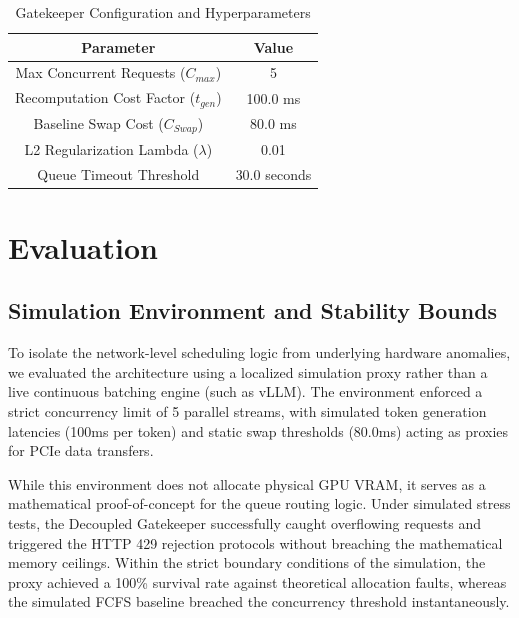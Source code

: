 \documentclass[conference]{IEEEtran}
\begin{document}
\begin{table}[h]
\caption{Gatekeeper Configuration and Hyperparameters}
\begin{center}
\begin{tabular}{|c|c|}
\hline
\textbf{Parameter} & \textbf{Value} \\
\hline
Max Concurrent Requests ($C_{max}$) & 5 \\
Recomputation Cost Factor ($t_{gen}$) & 100.0 ms \\
Baseline Swap Cost ($C_{Swap}$) & 80.0 ms \\
L2 Regularization Lambda ($\lambda$) & 0.01 \\
Queue Timeout Threshold & 30.0 seconds \\
\hline
\end{tabular}
\label{tab:params}
\end{center}
\end{table}




\section{Evaluation}

\subsection{Simulation Environment and Stability Bounds}
To isolate the network-level scheduling logic from underlying hardware anomalies, we evaluated the architecture using a localized simulation proxy rather than a live continuous batching engine (such as vLLM). The environment enforced a strict concurrency limit of 5 parallel streams, with simulated token generation latencies (100ms per token) and static swap thresholds (80.0ms) acting as proxies for PCIe data transfers. 

While this environment does not allocate physical GPU VRAM, it serves as a mathematical proof-of-concept for the queue routing logic. Under simulated stress tests, the Decoupled Gatekeeper successfully caught overflowing requests and triggered the HTTP 429 rejection protocols without breaching the mathematical memory ceilings. Within the strict boundary conditions of the simulation, the proxy achieved a 100\% survival rate against theoretical allocation faults, whereas the simulated FCFS baseline breached the concurrency threshold instantaneously.
\end{document}
